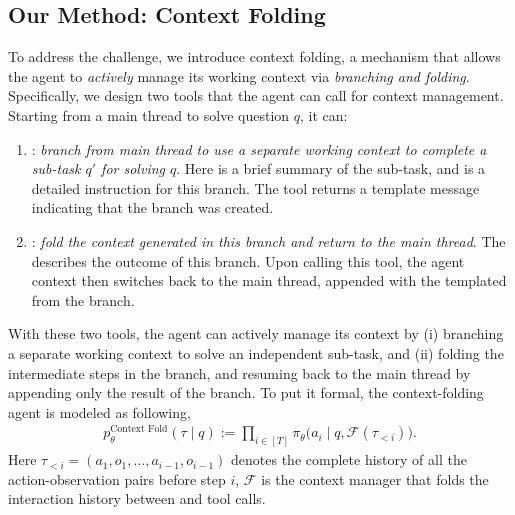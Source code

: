 \subsection{Our Method: Context Folding}
To address the challenge, we introduce context folding, a mechanism that allows the agent to \textit{actively} manage its working context via \textit{branching and folding}. 
Specifically, we design two tools that the agent can call for context management.
Starting from a main thread to solve question $q$, it can:
\begin{enumerate}[label=(\roman*),leftmargin=20pt]
    \item {}: \textit{branch from main thread to use a separate working context to complete a sub-task $q'$ for solving $q$}. 
    Here  is a brief summary of the sub-task, and  is a detailed instruction for this branch. 
    The tool returns a template message indicating that the branch was created. 
    \item {}: \textit{fold the context generated in this branch and return to the main thread}. The  describes the outcome of this branch.
    Upon calling this tool, the agent context then switches back to the main thread, appended with the templated  from the branch.
\end{enumerate}
With these two tools, the agent can actively manage its context by (i) branching a separate working context to solve an independent sub-task, and (ii) folding the intermediate steps in the branch, and resuming back to the main thread by appending only the result of the branch.
To put it formal, the context-folding agent is modeled as following,
\begin{align}
    p^{\text{Context Fold}}_{\theta}(\tau \mid q):= \prod_{i\in[T]} \pi_{\theta}\big(a_i\mid q, \mathcal{F}(\tau_{<i})\big).\label{eq: context fold model}
\end{align}
Here $\tau_{<i} = (a_1,o_1,\ldots, a_{i-1}, o_{i-1})$ denotes the complete history of all the action-observation pairs before step $i$, 
$\mathcal{F}$ is the context manager that folds the interaction history between \code{\textcolor{red}{branch}} and \code{\textcolor{blue}{return}} tool calls.
